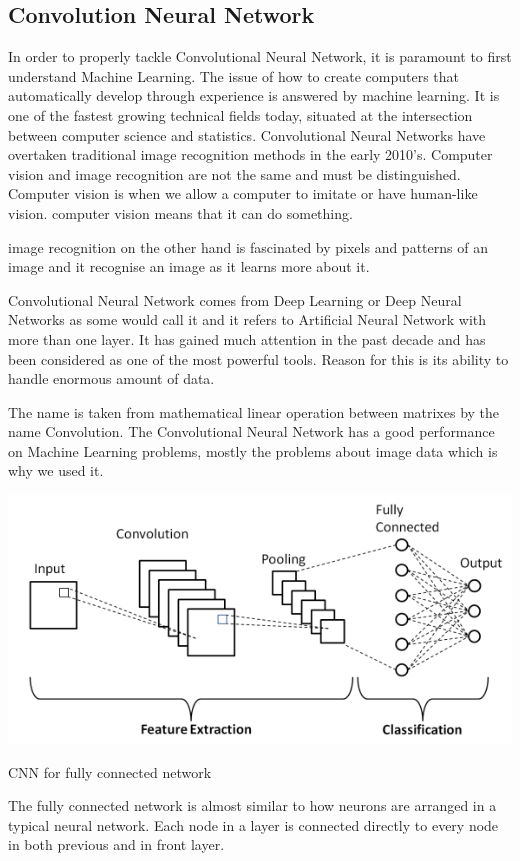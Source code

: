     

\subsection{Convolution Neural Network}
In order to properly tackle Convolutional Neural Network, it is paramount to first understand Machine Learning.
The issue of how to create computers that automatically develop through experience is answered by machine learning. It is one of the fastest growing technical fields today, situated at the intersection between computer science and statistics.\cite{jordan2015machine}
Convolutional Neural Networks have overtaken traditional image recognition methods in the early 2010's. 
Computer vision and image recognition are not the same and must be distinguished. Computer vision is when we allow a computer to imitate or have human-like vision. computer vision means that it can do something. 

image recognition on the other hand is fascinated by pixels and patterns of an image and it recognise an image as it learns more about it.


Convolutional Neural Network comes from Deep Learning or Deep Neural Networks as some would call it and it refers to
Artificial Neural Network with more than one layer. It has gained much attention in the past decade and has been considered as one of the most powerful tools.
Reason for this is its ability to handle enormous amount of data. \cite{albawi2017understanding}

The name is taken from mathematical linear operation between matrixes by the name Convolution. The Convolutional Neural Network
has a good performance on Machine Learning problems, mostly the problems about image data which is why we used it. 




    \centerline{\includegraphics[width=.5\textwidth,height=.7\textheight,keepaspectratio]{tex/images/cnn.jpg}}
    \caption{CNN for fully connected network}
    \label{fig:my_label}
  





The fully connected network is almost similar to how neurons are arranged in a typical neural network.
Each node in a layer is connected directly to every node in both previous and in front layer.

